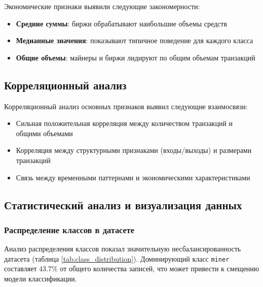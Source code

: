 Экономические признаки выявили следующие закономерности:

\begin{itemize}
    \item \textbf{Средние суммы}: биржи обрабатывают наибольшие объемы средств
    \item \textbf{Медианные значения}: показывают типичное поведение для каждого класса
    \item \textbf{Общие объемы}: майнеры и биржи лидируют по общим объемам транзакций
\end{itemize}

\subsection{Корреляционный анализ}

Корреляционный анализ основных признаков выявил следующие взаимосвязи:

\begin{itemize}
    \item Сильная положительная корреляция между количеством транзакций и общими объемами
    \item Корреляция между структурными признаками (входы/выходы) и размерами транзакций
    \item Связь между временными паттернами и экономическими характеристиками
\end{itemize}

\subsection{Статистический анализ и визуализация данных}

\subsubsection{Распределение классов в датасете}

Анализ распределения классов показал значительную несбалансированность датасета (таблица \ref{tab:class_distribution}). Доминирующий класс \texttt{miner} составляет 43.7\% от общего количества записей, что может привести к смещению модели классификации.

